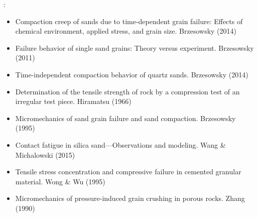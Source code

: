 \noindent \Literature:
\begin{itemize}
\item Compaction creep of sands due to time-dependent grain failure: Effects of chemical environment,
      applied stress, and grain size. Brzesowsky \etal{} (2014) \cite{brhb14}
\item Failure behavior of single sand grains: Theory versus experiment. Brzesowsky \etal{} (2011) \cite{brsp11}
\item Time-independent compaction behavior of quartz sands. Brzesowsky \etal{} (2014) \cite{brsp14}
\item Determination of the tensile strength of rock by a compression test of an 
      irregular test piece. Hiramatsu \etal{} (1966) \cite{hiok66}
\item Micromechanics of sand grain failure and sand compaction. Brzesowsky (1995) \cite{brze95}
\item Contact fatigue in silica sand—Observations and modeling. Wang \& Michalowski (2015) \cite{wami15}
\item Tensile stress concentration and compressive failure in cemented granular material. 
      Wong \& Wu (1995)\cite{wowu95}
\item Micromechanics of pressure-induced grain crushing in porous rocks. Zhang \etal{} (1990) \cite{zhwd90}
\end{itemize}




